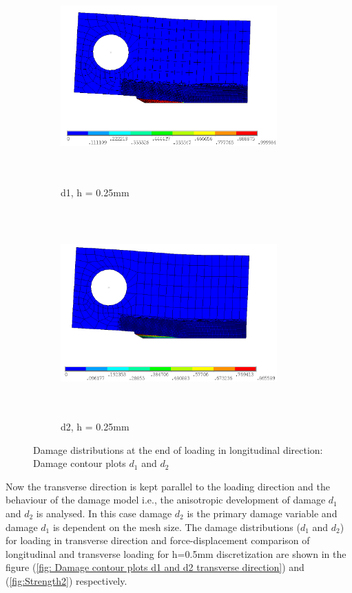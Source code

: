 \documentclass[a4paper,12pt,twoside]{report}
\begin{document}
\begin{figure}[htbp!]\ContinuedFloat
     \begin{subfigure}{0.4\textwidth}
         \centering
         \includegraphics[width=8.3cm,height=8.2cm,keepaspectratio]{26.d1-0.25.png}
         \caption{d1, h = 0.25mm}
         \label{fig:d1-0.25}
     \end{subfigure}
     \hspace{1.8cm}
     \begin{subfigure}{0.4\textwidth}
         \centering
         \includegraphics[width=8.3cm,height=8cm,keepaspectratio]{26.d2-0.25.png}
         \caption{d2, h = 0.25mm}
         \label{fig:d2-0.25}
     \end{subfigure}     
        \caption{Damage distributions at the end of loading in longitudinal direction: Damage contour plots $d_{1}$ and $d_{2}$ }
        \label{fig: Damage contour plots d1 and d2}     
\end{figure}
\FloatBarrier 
\indent\indent\indent Now the transverse direction is kept parallel to the loading direction and the behaviour of the damage model i.e., the anisotropic development of damage $d_{1}$ and $d_{2}$ is analysed. In this case damage $d_{2}$ is the primary damage variable and damage $d_{1}$ is dependent on the mesh size.  The damage distributions ($d_{1}$ and $d_{2}$) for loading in transverse direction and force-displacement comparison of  longitudinal and transverse loading for h=0.5mm discretization are shown in the figure (\ref{fig: Damage contour plots d1 and d2 transverse direction}) and (\ref{fig:Strength2}) respectively.
\end{document}
